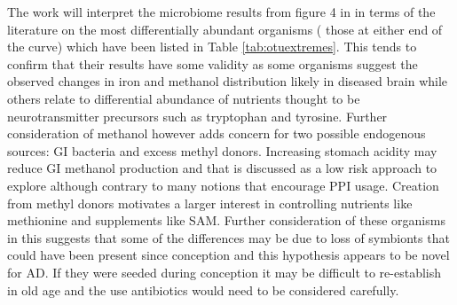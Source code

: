 \documentclass[aps,secnumarabic,balancelastpage,amsmath,amssymb,nofootinbib]{revtex4}
\newcommand{\mjmreftab}[1]{Table  \ref{tab:#1}}
\begin{document}
The work will  interpret the microbiome results
from figure 4 in \cite{10.3389/fcimb.2023.1123228} 
in terms of the literature on the most differentially abundant
organisms ( those at either end of the curve)
which have been listed in \mjmreftab{otuextremes}.
This tends to confirm that their results have some validity
as some organisms suggest the observed changes in iron and
methanol distribution likely in diseased brain while
others relate to differential abundance of nutrients
thought to be neurotransmitter precursors such as
tryptophan and tyrosine. Further consideration of methanol
however adds concern for  two possible endogenous sources:
GI bacteria and excess methyl donors. 
Increasing stomach acidity may reduce GI methanol
production and that is discussed as a low
risk approach to explore although contrary to
many notions that encourage PPI usage. 
Creation from methyl donors
motivates a larger interest in controlling nutrients like 
methionine and supplements like SAM.  
Further consideration  of these organisms in this  
suggests that some of the differences may be due to loss of
symbionts that could have been present since conception
and this hypothesis appears to be novel for AD.
If they were seeded during conception it may be difficult
to re-establish in old age and the use antibiotics would
need to be considered carefully. 


\begin{comment}
ir utility
for measuring properties of the CNS  environment such as nutritional
status with only incidental contributions to disease progression.
The work suggests the evidence largely supports an infectious
etiology but I try to show here that in fact the microbes
may be making an exceelent relevant measurement of nutrient
status in the brain. Some of the properties of the differentially
abundant organisms however do suggest way in which they may
assist or impair brain function by their presence.  
The authors produced a minimally processed list of OTU's that
differed in some ways between disease and control samples
and they tabulated the most extreme differences in the text
which is reproduced below, \mjmreftab{otuextremes}.

\end{comment}
\end{document}
